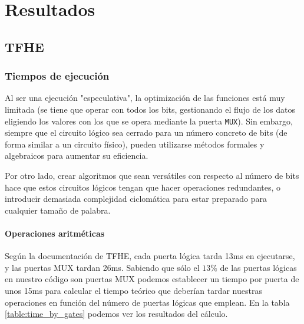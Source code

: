 \chapter{Resultados}
\label{chap:resultados}


\section{TFHE}

\subsection{Tiempos de ejecución}

Al ser una ejecución "especulativa", la optimización de las funciones está muy limitada (se tiene que operar con todos los bits, gestionando el flujo de los datos eligiendo los valores con los que se opera mediante la puerta \verb|MUX|). Sin embargo, siempre que el circuito lógico sea cerrado para un número concreto de bits (de forma similar a un circuito físico), pueden utilizarse métodos formales y algebraicos para aumentar su eficiencia.

Por otro lado, crear algoritmos que sean versátiles con respecto al número de bits hace que estos circuitos lógicos tengan que hacer operaciones redundantes, o introducir demasiada complejidad ciclomática para estar preparado para cualquier tamaño de palabra.

\subsubsection{Operaciones aritméticas}

Según la documentación de TFHE, cada puerta lógica tarda 13ms en ejecutarse, y las puertas MUX tardan 26ms. Sabiendo que sólo el $ 13\% $ de las puertas lógicas en nuestro código son puertas MUX podemos establecer un tiempo por puerta de unos 15ms para calcular el tiempo teórico que deberían tardar nuestras operaciones en función del número de puertas lógicas que emplean. En la tabla \ref{table:time_by_gates} podemos ver los resultados del cálculo.

